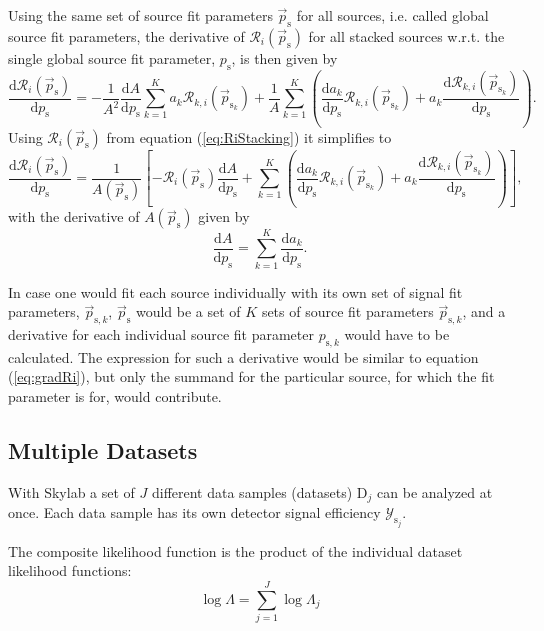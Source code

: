 \documentclass{article}
\newcommand{\ps}{\vec{p}_{\mathrm{s}}}
\newcommand{\psk}{\vec{p}_{\mathrm{s}_k}}
\begin{document}
Using the same set of source fit parameters $\ps$ for all sources, i.e. called
global source fit parameters, the derivative of $\mathcal{R}_i(\ps)$ for
all stacked sources w.r.t. the single global source fit parameter,
$p_{\mathrm{s}}$, is then given by
\begin{equation}
 \frac{\mathrm{d} \mathcal{R}_{i}(\ps)}{\mathrm{d} p_{\mathrm{s}}} = - \frac{1}{A^2} \frac{\mathrm{d} A}{\mathrm{d} p_{\mathrm{s}}} \sum_{k=1}^{K} a_{k} \mathcal{R}_{k,i}(\psk) + \frac{1}{A}\sum_{k=1}^{K} \left( \frac{\mathrm{d} a_{k}}{\mathrm{d} p_{\mathrm{s}}}\mathcal{R}_{k,i}(\psk) + a_{k}\frac{\mathrm{d} \mathcal{R}_{k,i}(\psk)}{\mathrm{d} p_{\mathrm{s}}} \right).
\end{equation}
Using $\mathcal{R}_i(\ps)$ from equation (\ref{eq:RiStacking}) it simplifies to
\begin{equation}
 \frac{\mathrm{d} \mathcal{R}_{i}(\ps)}{\mathrm{d} p_{\mathrm{s}}} = \frac{1}{A(\ps)}\left[ -\mathcal{R}_i(\ps)\frac{\mathrm{d} A}{\mathrm{d} p_{\mathrm{s}}} + \sum_{k=1}^{K} \left( \frac{\mathrm{d} a_{k}}{\mathrm{d} p_{\mathrm{s}}}\mathcal{R}_{k,i}(\psk) + a_{k}\frac{\mathrm{d} \mathcal{R}_{k,i}(\psk)}{\mathrm{d} p_{\mathrm{s}}} \right) \right],
 \label{eq:gradRi}
\end{equation}
with the derivative of $A(\ps)$ given by
\begin{equation}
 \frac{\mathrm{d} A}{\mathrm{d} p_{\mathrm{s}}} = \sum_{k=1}^{K} \frac{\mathrm{d} a_k}{\mathrm{d} p_{\mathrm{s}}}.
\end{equation}

In case one would fit each source individually with its own set of signal fit
parameters, $\vec{p}_{\mathrm{s},k}$, $\ps$ would be a set of $K$ sets
of source fit parameters $\vec{p}_{\mathrm{s},k}$, and a derivative for each
individual source fit parameter $p_{\mathrm{s},k}$ would have to be calculated.
The expression for such a derivative would be similar to equation (\ref{eq:gradRi}),
but only the summand for the particular source, for which the fit parameter is for, would
contribute.


\subsection{Multiple Datasets}

With Skylab a set of $J$ different data samples (datasets) $\mathrm{D}_j$ can be
analyzed at once. Each data sample has its own detector signal efficiency
$\mathcal{Y}_{\mathrm{s}_j}$.

The composite likelihood function is the product of the individual dataset
likelihood functions:
\begin{equation}
 \log \Lambda = \sum_{j=1}^{J} \log \Lambda_j
 \label{eq:logLambdaComposite}
\end{equation}
\end{document}
